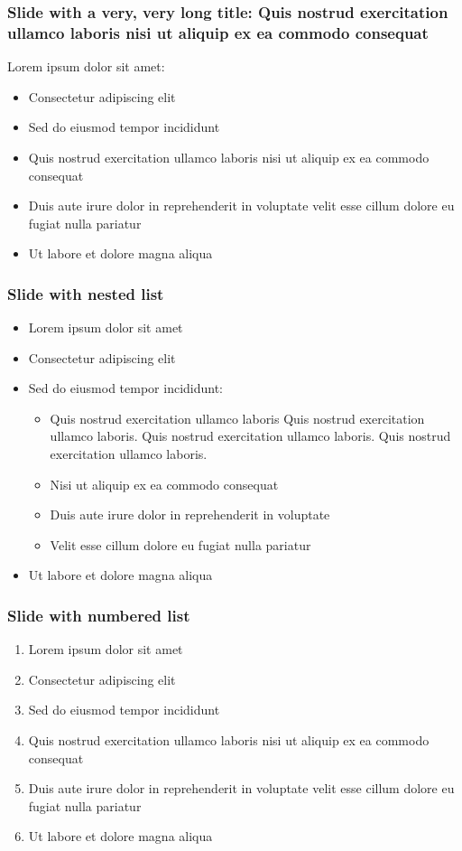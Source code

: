\documentclass[11pt,xcolor={dvipsnames},hyperref={pdftex,pdfpagemode=UseNone,hidelinks,pdfdisplaydoctitle=true},usepdftitle=false]{beamer}
\begin{document}

\begin{frame}
\frametitle{Slide with a very, very long title: Quis nostrud exercitation ullamco laboris nisi ut aliquip ex ea commodo consequat}
Lorem ipsum dolor sit amet:
\begin{itemize}
\item Consectetur adipiscing elit
\item Sed do eiusmod tempor incididunt
\item Quis nostrud exercitation ullamco laboris nisi ut aliquip ex ea commodo consequat
\item Duis aute irure dolor in reprehenderit in voluptate velit esse cillum dolore eu fugiat nulla pariatur
\item Ut labore et dolore magna aliqua
\end{itemize}
\end{frame}

\begin{frame}
\frametitle{Slide with nested list}
\begin{itemize}
\item Lorem ipsum dolor sit amet
\item Consectetur adipiscing elit
\item Sed do eiusmod tempor incididunt:
\begin{itemize}
\item Quis nostrud exercitation ullamco laboris Quis nostrud exercitation ullamco laboris. Quis nostrud exercitation ullamco laboris. Quis nostrud exercitation ullamco laboris.
\item Nisi ut aliquip ex ea commodo consequat
\item Duis aute irure dolor in reprehenderit in voluptate
\item Velit esse cillum dolore eu fugiat nulla pariatur
\end{itemize}
\item Ut labore et dolore magna aliqua
\end{itemize}
\end{frame}

\begin{frame}
\frametitle{Slide with numbered list}
\begin{enumerate}
\item Lorem ipsum dolor sit amet
\item Consectetur adipiscing elit
\item Sed do eiusmod tempor incididunt
\item Quis nostrud exercitation ullamco laboris nisi ut aliquip ex ea commodo consequat
\item Duis aute irure dolor in reprehenderit in voluptate velit esse cillum dolore eu fugiat nulla pariatur
\item Ut labore et dolore magna aliqua
\end{enumerate}
\end{frame}
\end{document}
